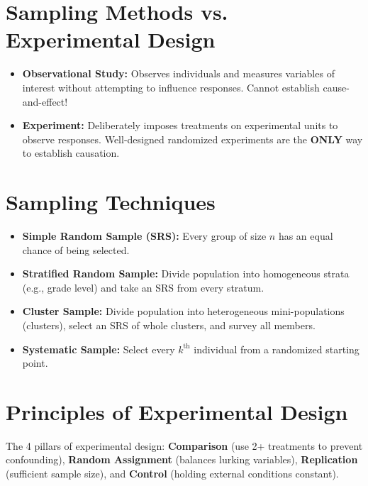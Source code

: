 ﻿\documentclass[11pt,oneside,openany]{book}
\begin{document}
\section{Sampling Methods vs. Experimental Design}
\begin{lessonbox}
\begin{itemize}[leftmargin=1.2em]
  \item \textbf{Observational Study:} Observes individuals and measures variables of interest without attempting to influence responses. Cannot establish cause-and-effect!
  \item \textbf{Experiment:} Deliberately imposes treatments on experimental units to observe responses. Well-designed randomized experiments are the \textbf{ONLY} way to establish causation.
\end{itemize}
\end{lessonbox}

\section{Sampling Techniques}
\begin{itemize}[leftmargin=1.5em]
  \item \textbf{Simple Random Sample (SRS):} Every group of size $n$ has an equal chance of being selected.
  \item \textbf{Stratified Random Sample:} Divide population into homogeneous strata (e.g., grade level) and take an SRS from every stratum.
  \item \textbf{Cluster Sample:} Divide population into heterogeneous mini-populations (clusters), select an SRS of whole clusters, and survey all members.
  \item \textbf{Systematic Sample:} Select every $k^{\text{th}}$ individual from a randomized starting point.
\end{itemize}

\section{Principles of Experimental Design}
The 4 pillars of experimental design:
\textbf{Comparison} (use 2+ treatments to prevent confounding), \textbf{Random Assignment} (balances lurking variables), \textbf{Replication} (sufficient sample size), and \textbf{Control} (holding external conditions constant).

\end{document}
